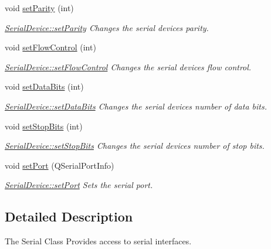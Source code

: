 \begin{DoxyCompactItemize}
void \hyperlink{class_serial_device_a91e293977d5401ededf350e19846b5a1}{set\+Parity} (int)
\begin{DoxyCompactList}\small\item\em \hyperlink{class_serial_device_a91e293977d5401ededf350e19846b5a1}{Serial\+Device\+::set\+Parity} Changes the serial device\textquotesingle{}s parity. \end{DoxyCompactList}\item 
void \hyperlink{class_serial_device_a74968289347c6ede64587287bb0cf699}{set\+Flow\+Control} (int)
\begin{DoxyCompactList}\small\item\em \hyperlink{class_serial_device_a74968289347c6ede64587287bb0cf699}{Serial\+Device\+::set\+Flow\+Control} Changes the serial device\textquotesingle{}s flow control. \end{DoxyCompactList}\item 
void \hyperlink{class_serial_device_ad0ddca3e77e1d1d4df7c68e83f1ecd91}{set\+Data\+Bits} (int)
\begin{DoxyCompactList}\small\item\em \hyperlink{class_serial_device_ad0ddca3e77e1d1d4df7c68e83f1ecd91}{Serial\+Device\+::set\+Data\+Bits} Changes the serial device\textquotesingle{}s number of data bits. \end{DoxyCompactList}\item 
void \hyperlink{class_serial_device_a95b44d8167ae0a6a025ba9c4f2d5ee47}{set\+Stop\+Bits} (int)
\begin{DoxyCompactList}\small\item\em \hyperlink{class_serial_device_a95b44d8167ae0a6a025ba9c4f2d5ee47}{Serial\+Device\+::set\+Stop\+Bits} Changes the serial device\textquotesingle{}s number of stop bits. \end{DoxyCompactList}\item 
void \hyperlink{class_serial_device_a1440b389cc1bba66e9854a32a5807a8f}{set\+Port} (Q\+Serial\+Port\+Info)
\begin{DoxyCompactList}\small\item\em \hyperlink{class_serial_device_a1440b389cc1bba66e9854a32a5807a8f}{Serial\+Device\+::set\+Port} Sets the serial port. \end{DoxyCompactList}\end{DoxyCompactItemize}


\subsection{Detailed Description}
The Serial Class Provides access to serial interfaces. 

